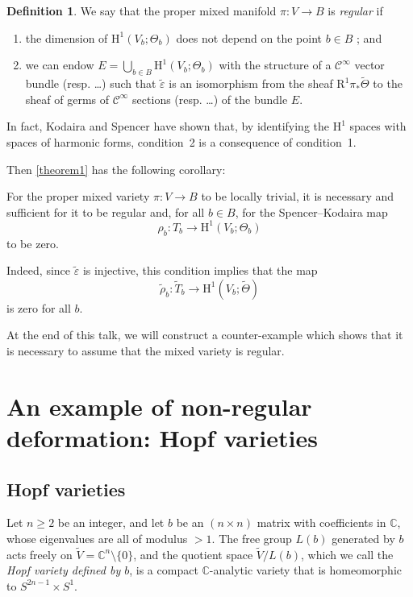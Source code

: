 \documentclass{article}
\theoremstyle{plain}
\newenvironment{proposition}[1]
    {\renewcommand\theinnercustomproposition{#1}\innercustomproposition}
    {\endinnercustomproposition}
\theoremstyle{definition}
\newtheorem*{definition*}{Definition}
\newcommand{\CC}{\mathbb{C}}
\newcommand{\HH}{\mathrm{H}}
\renewcommand{\geq}{\geqslant}
\newcommand{\oldpage}[1]{\marginpar{\footnotesize$\Big\vert$ \textit{p.~#1}}}
\begin{document}
\begin{definition*}
  We say that the proper mixed manifold $\pi\colon V\to B$ is \emph{regular} if
  \begin{enumerate}
    \item the dimension of $\HH^1(V_b;\Theta_b)$ does not depend on the point $b\in B$ ; and
    \item we can endow $E=\bigcup_{b\in B}\HH^1(V_b;\Theta_b)$ with the structure of a $\mathscr{C}^\infty$ vector bundle (resp. \ldots) such that $\widetilde{\varepsilon}$ is an isomorphism from the sheaf $\mathrm{R}^1\pi_*\widetilde{\Theta}$ to the sheaf of germs of $\mathscr{C}^\infty$ sections (resp. \ldots) of the bundle $E$.
  \end{enumerate}
\end{definition*}

In fact, Kodaira and Spencer have shown \cite{2} that, by identifying the $\HH^1$ spaces with spaces of harmonic forms, condition~2 is a consequence of condition~1.

Then \cref{theorem1} has the following corollary:

\begin{proposition}{1}
\label{proposition1}
  For the proper mixed variety $\pi\colon V\to B$ to be locally trivial, it is necessary and sufficient for it to be regular and, for all $b\in B$, for the Spencer--Kodaira map
  \[
    \rho_b\colon T_b \to \HH^1(V_b;\Theta_b)
  \]
  to be zero.
\end{proposition}

Indeed, since $\widetilde{\varepsilon}$ is injective, this condition implies that the map
\oldpage{3-04}
\[
  \widetilde{\rho}_b\colon \widetilde{T}_b \to \HH^1(V_b;\widetilde{\Theta})
\]
is zero for all $b$.

At the end of this talk, we will construct a counter-example which shows that it is necessary to assume that the mixed variety is regular.


\section{An example of non-regular deformation: Hopf varieties}
\label{III}

\subsection{Hopf varieties}
\label{III.1}

Let $n\geq2$ be an integer, and let $b$ be an $(n\times n)$ matrix with coefficients in $\CC$, whose eigenvalues are all of modulus $>1$.
The free group $L(b)$ generated by $b$ acts freely on $\widetilde{V}=\CC^n\setminus\{0\}$, and the quotient space $\widetilde{V}/L(b)$, which we call the \emph{Hopf variety defined by $b$}, is a compact $\CC$-analytic variety that is homeomorphic to $S^{2n-1}\times S^1$.
\end{document}

